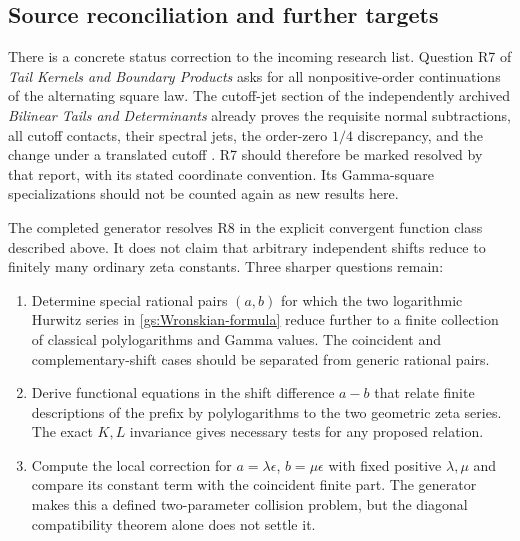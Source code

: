 \documentclass[11pt,letterpaper]{article}
\numberwithin{equation}{section}
\theoremstyle{definition}
\theoremstyle{remark}
\DeclareMathOperator{\Li}{Li}
\DeclareMathOperator{\Ree}{Re}
\newcommand{\ii}{\mathrm i}
\newcommand{\dd}{\,\mathrm d}
\newcommand{\C}{\mathbb C}
\newcommand{\N}{\mathbb N}
\begin{document}
\subsection{Source reconciliation and further targets}

There is a concrete status correction to the incoming research list.
Question R7 of \emph{Tail Kernels and Boundary Products} asks for all
nonpositive-order continuations of the alternating square law.
The cutoff-jet section of the independently archived
\emph{Bilinear Tails and Determinants} already proves the requisite
normal subtractions, all cutoff contacts, their spectral jets, the
order-zero $1/4$ discrepancy, and the change under a translated cutoff
\cite{RepoBilinear}.  R7 should therefore be marked resolved by
that report, with its stated coordinate convention.  Its Gamma-square
specializations should not be counted again as new results here.

The completed generator resolves R8 in the explicit convergent function
class described above.  It does not claim that arbitrary independent
shifts reduce to finitely many ordinary zeta constants.  Three sharper
questions remain:
\begin{enumerate}
\item Determine special rational pairs $(a,b)$ for which the two
logarithmic Hurwitz series in \eqref{gs:Wronskian-formula} reduce
further to a finite collection of classical polylogarithms and Gamma
values.  The coincident and complementary-shift cases should be
separated from generic rational pairs.
\item Derive functional equations in the shift difference $a-b$
that relate finite descriptions of the prefix by polylogarithms
to the two geometric zeta series.  The exact $K,L$ invariance gives
necessary tests for any proposed relation.
\item Compute the local correction for $a=\lambda\epsilon$,
$b=\mu\epsilon$ with fixed positive $\lambda,\mu$ and compare its
constant term with the coincident finite part.  The generator makes
this a defined two-parameter collision problem, but the diagonal
compatibility theorem alone does not settle it.
\end{enumerate}



\end{document}
